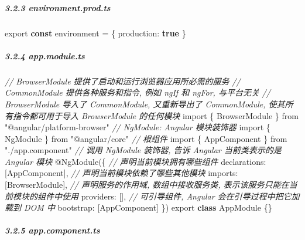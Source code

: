 \documentclass[
]{article}
\newenvironment{Shaded}{}{}
\newcommand{\CommentTok}[1]{\textcolor[rgb]{0.38,0.63,0.69}{\textit{#1}}}
\newcommand{\DataTypeTok}[1]{\textcolor[rgb]{0.56,0.13,0.00}{#1}}
\newcommand{\FunctionTok}[1]{\textcolor[rgb]{0.02,0.16,0.49}{#1}}
\newcommand{\ImportTok}[1]{#1}
\newcommand{\KeywordTok}[1]{\textcolor[rgb]{0.00,0.44,0.13}{\textbf{#1}}}
\newcommand{\NormalTok}[1]{#1}
\newcommand{\OperatorTok}[1]{\textcolor[rgb]{0.40,0.40,0.40}{#1}}
\newcommand{\StringTok}[1]{\textcolor[rgb]{0.25,0.44,0.63}{#1}}
\begin{document}
\hypertarget{323--environmentprodts}{%
\subparagraph{3.2.3 environment.prod.ts}\label{323--environmentprodts}}

\begin{Shaded}
\begin{Highlighting}[]
\ImportTok{export} \KeywordTok{const}\NormalTok{ environment }\OperatorTok{=}\NormalTok{ \{}
  \DataTypeTok{production}\OperatorTok{:} \KeywordTok{true}
\NormalTok{\}}
\end{Highlighting}
\end{Shaded}

\hypertarget{324-appmodulets}{%
\subparagraph{3.2.4 app.module.ts}\label{324-appmodulets}}

\begin{Shaded}
\begin{Highlighting}[]
\CommentTok{// BrowserModule 提供了启动和运行浏览器应用所必需的服务}
\CommentTok{// CommonModule 提供各种服务和指令, 例如 ngIf 和 ngFor, 与平台无关}
\CommentTok{// BrowserModule 导入了 CommonModule, 又重新导出了 CommonModule, 使其所有指令都可用于导入 BrowserModule 的任何模块 }
\ImportTok{import}\NormalTok{ \{ BrowserModule \} }\ImportTok{from} \StringTok{"@angular/platform{-}browser"}
\CommentTok{// NgModule: Angular 模块装饰器}
\ImportTok{import}\NormalTok{ \{ NgModule \} }\ImportTok{from} \StringTok{"@angular/core"}
\CommentTok{// 根组件}
\ImportTok{import}\NormalTok{ \{ AppComponent \} }\ImportTok{from} \StringTok{"./app.component"}
\CommentTok{// 调用 NgModule 装饰器, 告诉 Angular 当前类表示的是 Angular 模块}
\NormalTok{@}\FunctionTok{NgModule}\NormalTok{(\{}
  \CommentTok{// 声明当前模块拥有哪些组件}
  \DataTypeTok{declarations}\OperatorTok{:}\NormalTok{ [AppComponent]}\OperatorTok{,}
  \CommentTok{// 声明当前模块依赖了哪些其他模块}
  \DataTypeTok{imports}\OperatorTok{:}\NormalTok{ [BrowserModule]}\OperatorTok{,}
  \CommentTok{// 声明服务的作用域, 数组中接收服务类, 表示该服务只能在当前模块的组件中使用}
  \DataTypeTok{providers}\OperatorTok{:}\NormalTok{ []}\OperatorTok{,}
  \CommentTok{// 可引导组件, Angular 会在引导过程中把它加载到 DOM 中}
  \DataTypeTok{bootstrap}\OperatorTok{:}\NormalTok{ [AppComponent]}
\NormalTok{\})}
\ImportTok{export} \KeywordTok{class}\NormalTok{ AppModule \{\}}
\end{Highlighting}
\end{Shaded}

\hypertarget{325-appcomponentts}{%
\subparagraph{3.2.5 app.component.ts}\label{325-appcomponentts}}
\end{document}

